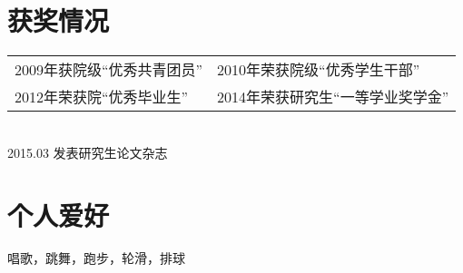 \documentclass[margin]{res}
\begin{document}
\begin{resume}
\section{获奖情况} 
	\begin{tabular}{ll}
		2009年获院级“优秀共青团员”  &2010年荣获院级“优秀学生干部”\\
		2012年荣获院“优秀毕业生”  &2014年荣获研究生“一等学业奖学金”\\
	 \end{tabular}\\
	 2015.03 发表研究生论文杂志

\section{个人爱好}             
	唱歌，跳舞，跑步，轮滑，排球
\end{resume}
\end{document}
